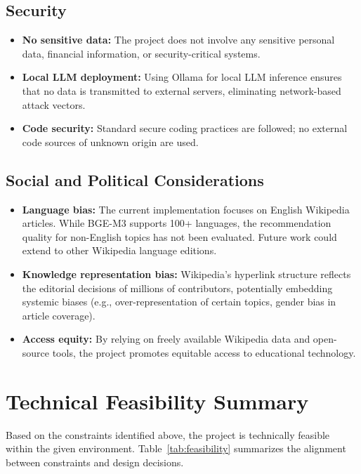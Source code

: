\subsection{Security}

\begin{itemize}
    \item \textbf{No sensitive data:} The project does not involve any sensitive personal data, financial information, or security-critical systems.
    \item \textbf{Local LLM deployment:} Using Ollama for local LLM inference ensures that no data is transmitted to external servers, eliminating network-based attack vectors.
    \item \textbf{Code security:} Standard secure coding practices are followed; no external code sources of unknown origin are used.
\end{itemize}

\subsection{Social and Political Considerations}

\begin{itemize}
    \item \textbf{Language bias:} The current implementation focuses on English Wikipedia articles. While BGE-M3 supports 100+ languages, the recommendation quality for non-English topics has not been evaluated. Future work could extend to other Wikipedia language editions.
    \item \textbf{Knowledge representation bias:} Wikipedia's hyperlink structure reflects the editorial decisions of millions of contributors, potentially embedding systemic biases (e.g., over-representation of certain topics, gender bias in article coverage).
    \item \textbf{Access equity:} By relying on freely available Wikipedia data and open-source tools, the project promotes equitable access to educational technology.
\end{itemize}

\section{Technical Feasibility Summary}

Based on the constraints identified above, the project is technically feasible within the given environment. Table~\ref{tab:feasibility} summarizes the alignment between constraints and design decisions.

